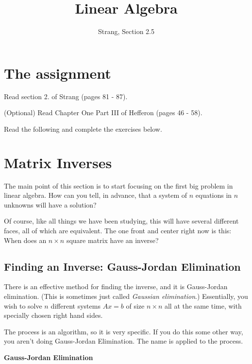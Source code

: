 \documentclass[11pt]{amsart}
\theoremstyle{definition}
\begin{document}
\title{Linear Algebra}
\author{Strang, Section 2.5}
\maketitle

\section{The assignment}
\begin{compactitem}
\item Read section 2. of Strang (pages 81 - 87).
\item (Optional) Read Chapter One Part III of Hefferon (pages 46 - 58).
\item Read the following and complete the exercises below.
\end{compactitem}


\section{Matrix Inverses}

The main point of this section is to start focusing on the first big problem in linear algebra. How can you tell, in advance, that a system of $n$ equations in $n$ unknowns will have a solution?

Of course, like all things we have been studying, this will have several different faces, all of which are equivalent. The one front and center right now is this: When does an $n \times n$ square matrix have an inverse?

\subsection{Finding an Inverse: Gauss-Jordan Elimination}

There is an effective method for finding the inverse, and it is Gauss-Jordan elimination. (This is sometimes just called \emph{Gaussian elimination}.) Essentially, you wish to solve $n$ different systems $Ax= b$ of size $n\times n$ all at the same time, with specially chosen right hand sides.


The process is an algorithm, so it is very specific. If you do this some other way, you aren't doing Gauss-Jordan Elimination. The name is applied to the process.

\begin{center}
\textbf{Gauss-Jordan Elimination}
\end{center}
\end{document}
